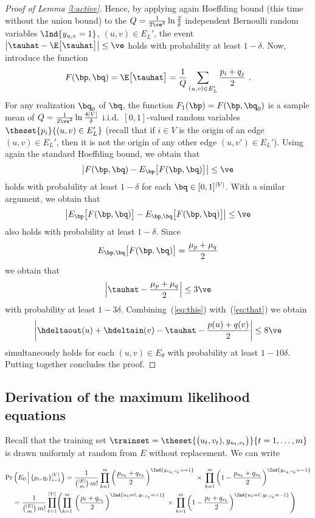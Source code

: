 \begin{proof}[Proof of Lemma \ref{l:active}]
Hence, by applying again Hoeffding bound (this time without the union bound) to the $Q =
\tfrac{1}{2\ve^2}\ln\tfrac{2}{\delta}$ independent Bernoulli random variables $\Ind{y_{u,v} = 1}$,
$(u,v) \in E_L'$, the event
$
\big| \tauhat - \E\big[\tauhat\big] \big| \le \ve
$
holds with probability at least $1-\delta$. Now, introduce the function
\[
  F(\bp,\bq) = \E\big[\tauhat\big] = \frac{1}{Q}\sum_{(u,v) \in E_L'} \frac{p_i+q_j}{2}~.
\]
For any realization $\bq_0$ of $\bq$, the function $F_1(\bp) = F(\bp,\bq_0)$ is a sample mean of $Q
= \tfrac{1}{2\ve^2}\ln\tfrac{4|V|}{\delta}$ i.i.d.\ $[0,1]$-valued random variables
$\theset{p_i}{(u,v) \in E_L'}$ (recall that if $i \in V$ is the origin of an edge $(u,v) \in E_L'$,
then it is not the origin of any other edge $(u,v') \in E_L'$). Using again the standard Hoeffding
bound, we obtain that
\[
  \left| F(\bp,\bq) - E_{\bp}\big[F(\bp,\bq)\big] \right| \le \ve
\]
holds with probability at least $1 -\delta$ for each $\bq\in [0,1]^{|V|}$. With a similar argument,
we obtain that
\[
  \left| E_{\bp}\big[F(\bp,\bq)\big] - E_{\bp,\bq}\big[F(\bp,\bq)\big] \right| \le \ve
\]
also holds with probability at least $1 -\delta$. Since
\[
  E_{\bp,\bq}\big[F(\bp,\bq)\big] = \frac{\mu_p+\mu_q}{2}
\]
we obtain that
\begin{equation}
  \label{eq:that}
  \Big| \tauhat - \frac{\mu_p+\mu_q}{2} \Big| \le 3\ve
\end{equation}
with probability at least $1-3\delta$. Combining~(\ref{eq:this}) with~(\ref{eq:that}) we obtain
\[
  \left| \hdeltaout(u) + \hdeltain(v) - \tauhat - \frac{p(u) + q(v)}{2} \right| \le 8\ve
\]
simultaneously holds for each $(u,v) \in E_{\theta}$ with probability at least $1 - 10\delta$.
Putting together concludes the proof.
\end{proof}

\subsection{Derivation of the maximum likelihood equations}

Recall that the training set $\trainset = \theset{\big(u_t,v_t),y_{u_t,v_t}\big)}{t=1,\dots,m}$
is drawn uniformly at random from $E$ without replacement. 
We can write

\begin{align*}
  \Pr&\left(E_0\,\Big|\, \{p_i, q_i\}_{i=1}^{|V|}\right) = 
  \frac{1}{\binom{|E|}{m}\,m!}\prod_{k=1}^m \left(\frac{p_{u_k}+q_{v_k}}{2} \right)^{\Ind{y_{u_k,v_k}=+1}}\,
  \times\,\prod_{k=1}^m\left(1-\frac{p_{u_k}+q_{v_k}}{2} \right)^{\Ind{y_{u_k,v_k}=-1}}\\
  &=
  \frac{1}{\binom{|E|}{m}\,m!}
  \prod_{\ell=1}^{|V|}\Biggl(\prod_{k=1}^m\,
    \left(\frac{p_{\ell}+q_{v_k}}{2} \right)^{\Ind{u_k = \ell,\,y_{\ell,v_k}=+1}}\,\times\,
    \prod_{k=1}^m\left(1-\frac{p_{\ell}+q_{v_k}}{2} \right)^{\Ind{u_k = \ell,\,y_{\ell,v_k}=-1}}\Biggl)
\end{align*}

